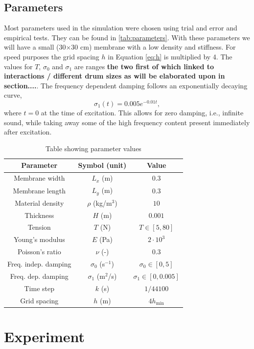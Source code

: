\documentclass{vgtc}
\begin{document}
\subsection{Parameters}
Most parameters used in the simulation were chosen using trial and error and empirical tests. They can be found in \autoref{tab:parameters}. With these parameters we will have a small (30$\times$30 cm) membrane with a low density and stiffness. For speed purposes the grid spacing $h$ in Equation \eqref{eq:h} is multiplied by 4. The values for $T$, $\sigma_0$ and $\sigma_1$ are ranges \textbf{the two first of which linked to interactions / different drum sizes as will be elaborated upon in section....}. The frequency dependent damping follows an exponentially decaying curve, 
\begin{equation}
    \sigma_1(t) = 0.005e^{-0.01 t},
\end{equation}
where $t=0$ at the time of excitation. This allows for zero damping, i.e., infinite sound, while taking away some of the high frequency content present immediately after excitation.
\begin{table}[h]
\caption{Table showing parameter values}\label{tab:parameters}
\centering
\begin{tabular}{|c|c|c|}
    \hline
    Parameter & Symbol (unit) & Value \\
    \hline
    Membrane width & $L_x$ (m) & $0.3$\\
    Membrane length & $L_y$ (m) & $0.3$ \\
    Material density & $\rho$ (kg/m$^3$)& $10$ \\
    Thickness & $H$ (m) & $0.001$ \\
    Tension & $T$ (N) & $T \in [5, 80]$ \\
    Young's modulus & $E$ (Pa)& $2\cdot 10^3$ \\
    Poisson's ratio & $\nu$ (-)& $0.3$ \\
    Freq. indep. damping & $\sigma_0$ (s$^{-1}$) & $\sigma_0 \in [0, 5]$\\
    Freq. dep. damping & $\sigma_1$ (m$^2$/s) & $\sigma_1 \in [0, 0.005]$\\
    Time step & $k$ (s) & $1/44100$\\
    Grid spacing & $h$ (m) & $4h_\text{min}$\\
    \hline
\end{tabular}
\end{table}\vspace{1em}

\section{Experiment}\label{sec:exp}
\end{document}
